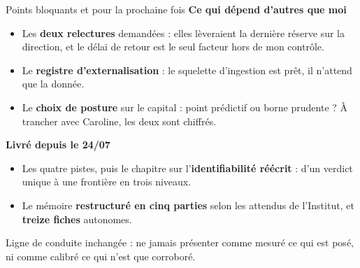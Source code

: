 \documentclass[11pt]{beamer}
\begin{document}
\begin{frame}{Points bloquants et pour la prochaine fois}
\small
\textbf{Ce qui dépend d'autres que moi}
\begin{itemize}\itemsep1pt
\item Les \textbf{deux relectures} demandées : elles lèveraient la dernière réserve sur la
      direction, et le délai de retour est le seul facteur hors de mon contrôle.
\item Le \textbf{registre d'externalisation} : le squelette d'ingestion est prêt, il n'attend
      que la donnée.
\item Le \textbf{choix de posture} sur le capital : point prédictif ou borne prudente ? À
      trancher avec Caroline, les deux sont chiffrés.
\end{itemize}
\textbf{Livré depuis le 24/07}
\begin{itemize}\itemsep1pt
\item Les quatre pistes, puis le chapitre sur l'\textbf{identifiabilité réécrit} : d'un verdict
      unique à une frontière en trois niveaux.
\item Le mémoire \textbf{restructuré en cinq parties} selon les attendus de l'Institut, et
      \textbf{treize fiches} autonomes.
\end{itemize}
\vfill
\begin{block}{}
Ligne de conduite inchangée : ne jamais présenter comme mesuré ce qui est posé, ni comme
calibré ce qui n'est que corroboré.
\end{block}
\end{frame}
\end{document}
